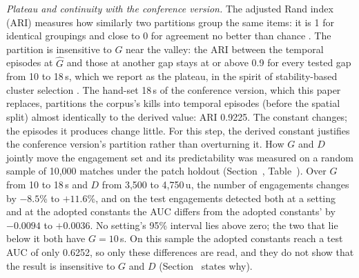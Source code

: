 \emph{Plateau and continuity with the conference version.} The adjusted Rand index (ARI) measures how
similarly two partitions group the same items: it is 1 for identical groupings and close to 0 for
agreement no better than chance \cite{hubert1985comparing}. The partition is insensitive to $G$ near the
valley: the ARI between the temporal episodes at $\hat G$ and those at another gap stays at or above 0.9
for every tested gap from 10 to 18\,s, which we report as the plateau, in the spirit of stability-based
cluster selection \cite{campello2013hdbscan}. The hand-set 18\,s of the conference version, which this
paper replaces, partitions the corpus's kills into temporal episodes (before the spatial split) almost
identically to the derived value: ARI 0.9225. The constant changes; the episodes it produces change
little. For this step, the derived constant justifies the conference version's partition rather than
overturning it.
How $G$ and $D$ jointly move the engagement set and its predictability was measured on a random sample of
10,000 matches under the patch holdout (Section~, Table~).
Over $G$ from 10 to 18\,s and $D$ from 3,500 to 4,750\,u, the number of engagements changes by $-8.5$\% to
$+11.6$\%, and on the test engagements detected both at a setting and at the adopted constants the AUC
differs from the adopted constants' by $-0.0094$ to $+0.0036$. No setting's 95\% interval lies above zero;
the two that lie below it both have $G = 10$\,s. On this sample the adopted constants reach a test AUC of
only 0.6252, so only these differences are read, and they do not show that the result is insensitive to
$G$ and $D$ (Section~ states why).

